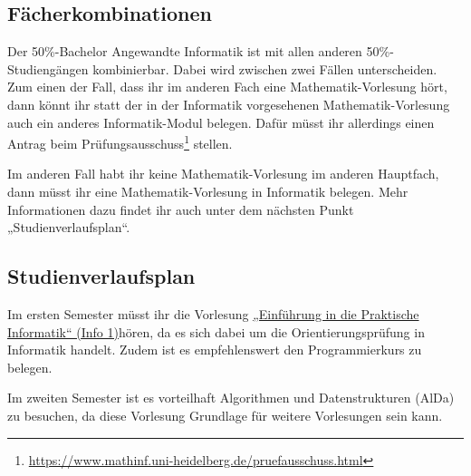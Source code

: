 \newpage{}

\subsection{Fächerkombinationen}
Der 50\%-Bachelor Angewandte Informatik ist mit allen anderen 50\%-Studiengängen kombinierbar. Dabei wird zwischen zwei Fällen unterscheiden. Zum einen der Fall, dass ihr im anderen Fach eine Mathematik-Vorlesung hört, dann könnt ihr statt der in der Informatik vorgesehenen Mathematik-Vorlesung auch ein anderes Informatik-Modul belegen. Dafür müsst ihr allerdings einen Antrag beim Prüfungsausschuss\footnote{\url{https://www.mathinf.uni-heidelberg.de/pruefausschuss.html}} stellen. 

Im anderen Fall habt ihr keine Mathematik-Vorlesung im anderen Hauptfach, dann müsst ihr eine Mathematik-Vorlesung in Informatik belegen. Mehr Informationen dazu findet ihr auch unter dem nächsten Punkt „Studienverlaufsplan“.

\subsection{Studienverlaufsplan}
Im ersten Semester müsst ihr die Vorlesung \hyperref[info1]{„Einführung in die Praktische Informatik“ (Info 1)}hören, da es sich dabei um die Orientierungsprüfung in Informatik handelt. Zudem ist es empfehlenswert den Programmierkurs zu belegen.

Im zweiten Semester ist es vorteilhaft Algorithmen und Datenstrukturen (AlDa) zu besuchen, da diese Vorlesung Grundlage für weitere Vorlesungen sein kann. 

